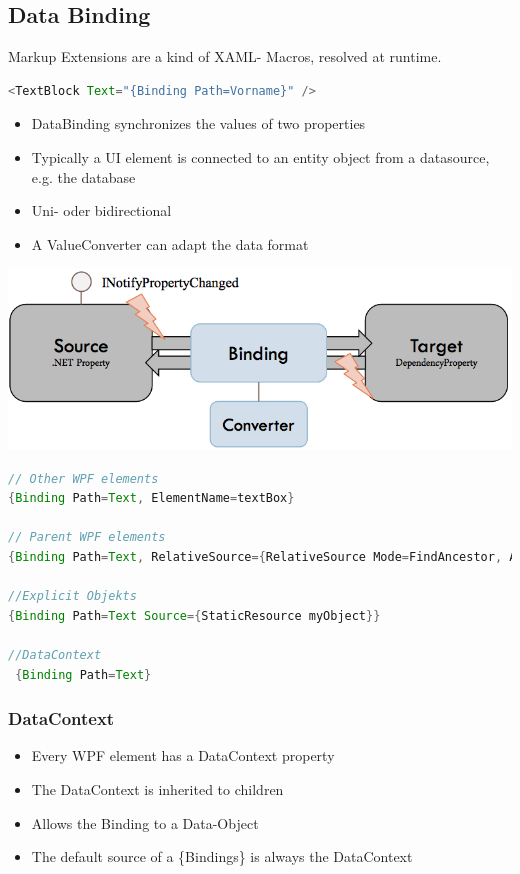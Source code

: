 \documentclass[10pt]{article}
\begin{document}
\subsection{Data Binding}
Markup Extensions are a kind of XAML- Macros, resolved at runtime.
\begin{lstlisting}[language=Java, caption=Data Binding, style=JavaStyle]
<TextBlock Text="{Binding Path=Vorname}" />
\end{lstlisting}
\begin{itemize}
	\item DataBinding synchronizes the values of two properties
	\item Typically a UI element is connected to an entity object from a datasource, e.g. the database
	\item Uni- oder bidirectional
	\item A ValueConverter can adapt the data format
\end{itemize}
\begin{center}
	\includegraphics[scale=0.4]{xaml_dataBinding.png}
\end{center}
\begin{lstlisting}[language=Java, caption=Sources Data Binding, style=JavaStyle]
// Other WPF elements
{Binding Path=Text, ElementName=textBox}

// Parent WPF elements
{Binding Path=Text, RelativeSource={RelativeSource Mode=FindAncestor, AncestorType=ListBox}}

//Explicit Objekts
{Binding Path=Text Source={StaticResource myObject}}

//DataContext
 {Binding Path=Text}
\end{lstlisting}
\subsubsection{DataContext}
\begin{itemize}
	\item Every WPF element has a DataContext property
	\item The DataContext is inherited to children
	\item Allows the Binding to a Data-Object
	\item The default source of a \{Bindings\} is always the DataContext
\end{itemize}
\end{document}

